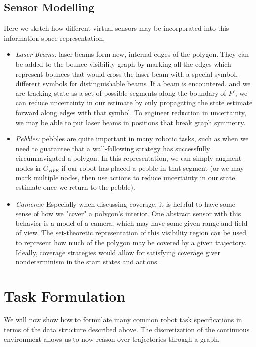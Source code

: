 \documentclass[]{svproc}  %
\begin{document}
\subsection{Sensor Modelling}

Here we sketch how different virtual sensors may be incorporated into this
information space representation.

\begin{itemize}
\item \emph{Laser Beams:} laser beams form new, internal edges of the polygon. They can be
added to the bounce visibility graph by marking all the edges which represent
bounces that would cross the laser beam with a special symbol. different symbols
for distinguishable beams. If a beam is encountered, and we are tracking state
as a set of possible segments along the boundary of $P'$, we can reduce
uncertainty in our estimate by only propagating the state estimate
forward along edges with that symbol. To engineer reduction in uncertainty,
we may be able to put laser beams in positions that break graph symmetry.
\item \emph{Pebbles:} pebbles are quite important in many robotic tasks, such as
when we need to guarantee that a wall-following strategy has successfully
circumnavigated a polygon. In this representation, we can simply augment nodes
in $G_{BVE}$ if our robot has placed a pebble in that segment (or we may mark
multiple nodes, then use actions to reduce uncertainty in our state estimate
once we return to the pebble).
\item \emph{Cameras:} Especially when discussing coverage, it is helpful to have
some sense of how we "cover" a polygon's interior. One abstract sensor with this
behavior is a model of a camera, which may have some given range and field of
view. The set-theoretic representation of this visibility region can be used to
represent how much of the polygon may be covered by a given trajectory. Ideally,
coverage strategies would allow for satisfying coverage given nondeterminism in
the start states and actions.
\end{itemize}

\section{Task Formulation}

We will now show how to formulate many common robot task specifications in terms
of the data structure described above. The discretization of the continuous
environment allows us to now reason over trajectories through a graph.
\end{document}
